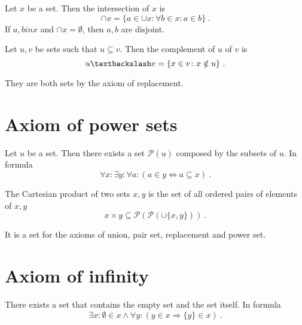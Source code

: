     \begin{definition}
        Let $x$ be a set. Then the intersection of $x$ is 
        \begin{equation*}
            \cap x = \{a \in \cup x \colon \forall b \in x \colon a \in b\} ~.
        \end{equation*}
        If $a, b in x$ and $\cap x = \emptyset$, then $a, b$ are disjoint.
    \end{definition}

    \begin{definition}
        Let $u, v$ be sets such that $u \subseteq v$. Then the complement of $u$ of $v$ is 
        \begin{equation*}
            u \textbackslash v = \{x \in v \colon x \notin u \} ~.
        \end{equation*}
    \end{definition}
    They are both sets by the axiom of replacement.

\section{Axiom of power sets}

    \begin{axiom}
        Let $u$ be a set. Then there exists a set $\mathcal P(u)$ composed by the subsets of $u$. In formula 
        \begin{equation*}
            \forall x \colon \exists y \colon \forall a \colon (a \in y \Leftrightarrow a \subseteq x) ~.
        \end{equation*}
    \end{axiom}

    \begin{definition}
        The Cartesian product of two sets $x, y$ is the set of all ordered pairs of elements of $x, y$
        \begin{equation*}
            x \times y \subseteq \mathcal P (\mathcal P ( \cup \{x,y\})) ~.
        \end{equation*}
    \end{definition}
    It is a set for the axioms of union, pair set, replacement and power set.

\section{Axiom of infinity}

    \begin{axiom}[Infinity]
        There exists a set that contains the empty set and the set itself. In formula
        \begin{equation*}
            \exists x \colon \emptyset \in x \land \forall y \colon (y \in x \Rightarrow \{y\} \in x) ~.
        \end{equation*}
    \end{axiom}

